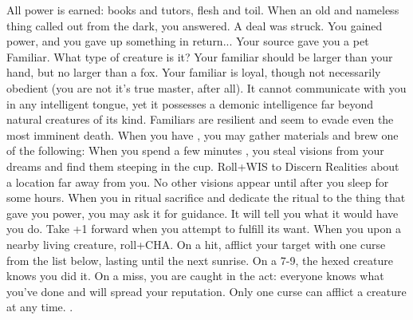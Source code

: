 \documentclass[darkmode]{dw_playbook}
\begin{document}
    {
            {All power is earned: books and tutors, flesh and toil.  When an old and nameless thing called out from the dark, you answered.  A deal was struck. You gained power, and you gave up something in return...
            \gap
            Your source gave you a pet Familiar.  What type of creature is it? Your familiar should be larger than your hand, but no larger than a fox.
            \gap
            Your familiar is loyal, though not necessarily obedient (you are not it’s true master, after all).  It cannot communicate with you in any intelligent tongue, yet it possesses a demonic intelligence far beyond natural creatures of its kind. Familiars are resilient and seem to evade even the most imminent death.}
        \gap
            {When you have , you may gather materials and brew one of the following:
            \gapSm
            \gapSm
            \gapSm
            }
        \gap
            {When you spend a few minutes , you steal visions from your dreams and find them steeping in the cup. Roll+WIS to Discern Realities about a location far away from you.  No other visions appear until after you sleep for some hours.}
            {When you  in ritual sacrifice and dedicate the ritual to the thing that gave you power, you may ask it for guidance.  It will tell you what it would have you do.  Take +1 forward when you attempt to fulfill its want.}
        \gap
            {When you  upon a nearby living creature, roll+CHA.  On a hit, afflict your target with one curse from the list below, lasting until the next sunrise.  On a 7-9, the hexed creature knows you did it.  On a miss, you are caught in the act: everyone knows what you’ve done and will spread your reputation.  Only one curse can afflict a creature at any time.
            \gapSm
            \gapSm
            .
            \gapSm
            \gapSm
            \gapSm
            \gapSm
            \gapSm
            \gapSm
            }
    }
\end{document}
